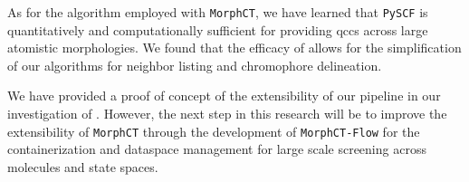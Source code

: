 As for the algorithm employed with \texttt{MorphCT}, we have learned that
\texttt{PySCF} is quantitatively and computationally sufficient for providing
\gls{qcc}s across large atomistic morphologies. We found that the efficacy of
 allows for the simplification of our algorithms for neighbor
listing and chromophore delineation.  

We have provided a proof of concept of the extensibility of our pipeline
in our investigation of . However, the next step in this research
will be to improve the extensibility of \texttt{MorphCT} through the development
of \texttt{MorphCT-Flow} for the containerization and dataspace management for
large scale screening across molecules and state spaces. 










